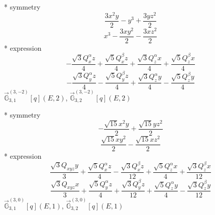 \documentclass[fleqn,8pt]{jsarticle}
\begin{document}
\noindent\quad ** symmetry
\begin{dmath*}
\frac{3 x^{2} y}{2} - y^{3} + \frac{3 y z^{2}}{2}
\end{dmath*}
\begin{dmath*}
x^{3} - \frac{3 x y^{2}}{2} - \frac{3 x z^{2}}{2}
\end{dmath*}
\noindent\quad ** expression
\begin{dmath*}
- \frac{\sqrt{3} Q_{x}^{\alpha} z}{4} + \frac{\sqrt{5} Q_{x}^{\beta} z}{4} + \frac{\sqrt{3} Q_{z}^{\alpha} x}{4} + \frac{\sqrt{5} Q_{z}^{\beta} x}{4}
\end{dmath*}
\begin{dmath*}
- \frac{\sqrt{3} Q_{y}^{\alpha} z}{4} - \frac{\sqrt{5} Q_{y}^{\beta} z}{4} + \frac{\sqrt{3} Q_{z}^{\alpha} y}{4} - \frac{\sqrt{5} Q_{z}^{\beta} y}{4}
\end{dmath*}
\noindent\quad $\vec{\mathbb{G}}_{3,1}^{(3,-2)}[q](E,2)$, $\vec{\mathbb{G}}_{3,2}^{(3,-2)}[q](E,2)$

\noindent\quad ** symmetry
\begin{dmath*}
- \frac{\sqrt{15} x^{2} y}{2} + \frac{\sqrt{15} y z^{2}}{2}
\end{dmath*}
\begin{dmath*}
\frac{\sqrt{15} x y^{2}}{2} - \frac{\sqrt{15} x z^{2}}{2}
\end{dmath*}
\noindent\quad ** expression
\begin{dmath*}
\frac{\sqrt{3} Q_{xyz} y}{3} + \frac{\sqrt{5} Q_{x}^{\alpha} z}{4} - \frac{\sqrt{3} Q_{x}^{\beta} z}{12} + \frac{\sqrt{5} Q_{z}^{\alpha} x}{4} + \frac{\sqrt{3} Q_{z}^{\beta} x}{12}
\end{dmath*}
\begin{dmath*}
\frac{\sqrt{3} Q_{xyz} x}{3} + \frac{\sqrt{5} Q_{y}^{\alpha} z}{4} + \frac{\sqrt{3} Q_{y}^{\beta} z}{12} + \frac{\sqrt{5} Q_{z}^{\alpha} y}{4} - \frac{\sqrt{3} Q_{z}^{\beta} y}{12}
\end{dmath*}
\noindent\quad $\vec{\mathbb{G}}_{3,1}^{(3,0)}[q](E,1)$, $\vec{\mathbb{G}}_{3,2}^{(3,0)}[q](E,1)$
\end{document}
